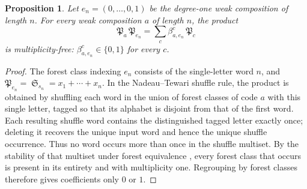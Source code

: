 \documentclass[pdflatex,sn-mathphys-num]{sn-jnl}
\numberwithin{equation}{subsection}
\DeclareMathOperator{\sch}{\mathfrak{S}}
\newcommand{\forest}{\mathfrak{P}}
\theoremstyle{thmstyleone}
\newtheorem{proposition}[lemma]{Proposition}
\theoremstyle{thmstylethree}
\theoremstyle{thmstyletwo}
\begin{document}
\begin{proposition}\label{proposition:degreeone}
Let $e_n=(0,\ldots,0,1)$ be the degree-one weak composition of length $n$. For every weak composition $a$ of length $n$, the product
$$\forest_a\,\forest_{e_n}=\sum_c\beta_{a,e_n}^c\,\forest_c$$
is multiplicity-free: $\beta_{a,e_n}^c\in\{0,1\}$ for every $c$.
\end{proposition}
\begin{proof}
The forest class indexing $e_n$ consists of the single-letter word $n$, and $\forest_{e_n}=\sch_{s_n}=x_1+\cdots+x_n$. In the Nadeau--Tewari shuffle rule, the product is obtained by shuffling each word in the union of forest classes of code $a$ with this single letter, tagged so that its alphabet is disjoint from that of the first word. Each resulting shuffle word contains the distinguished tagged letter exactly once; deleting it recovers the unique input word and hence the unique shuffle occurrence. Thus no word occurs more than once in the shuffle multiset. By the stability of that multiset under forest equivalence \cite[Theorem~6.3]{nadeau2024forest}, every forest class that occurs is present in its entirety and with multiplicity one. Regrouping by forest classes therefore gives coefficients only $0$ or $1$.
\end{proof}

\providecommand{\pd}[3]{%
  \begin{tikzpicture}[baseline=(current bounding box.center),scale=0.4,thick,line cap=round]
    \foreach \i in {1,...,#1} {%
      \foreach \j in {1,...,#2} {%
        \draw[gray!30,very thin] ({\j-1},{#1-\i}) rectangle ({\j},{#1-\i+1});%
        \draw[blue!70] ({\j-1},{#1-\i+0.5}) arc[start angle=270,end angle=360,radius=0.5];%
        \draw[blue!70] ({\j-0.5},{#1-\i}) arc[start angle=180,end angle=90,radius=0.5];%
      }%
    }%
    \foreach \i/\j in {#3} {%
      \fill[white] ({\j-1},{#1-\i}) rectangle ({\j},{#1-\i+1});%
      \draw[gray!30,very thin] ({\j-1},{#1-\i}) rectangle ({\j},{#1-\i+1});%
      \draw[blue!70] ({\j-1},{#1-\i+0.5}) -- ({\j},{#1-\i+0.5});%
      \draw[blue!70] ({\j-0.5},{#1-\i}) -- ({\j-0.5},{#1-\i+1});%
      \pgfmathtruncatemacro{\pdlbl}{\i+\j-1}%
      \node[font=\Large\bfseries,text=green!60!black,fill=white,inner sep=0.5pt,circle,transform shape] at ({\j-0.5},{#1-\i+0.5}) {\pdlbl};%
    }%
  \end{tikzpicture}}
\end{document}

